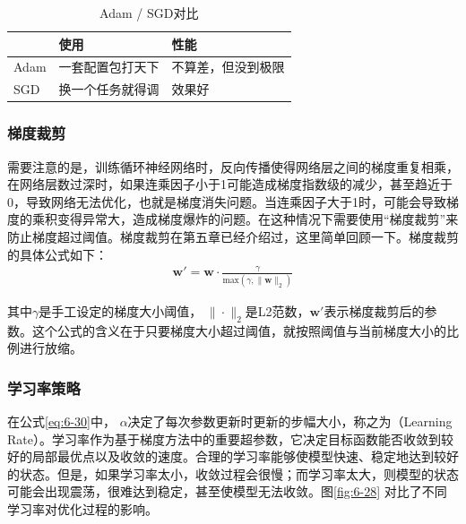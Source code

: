 \begin{table}[htp]
\centering
\caption{ Adam / SGD对比}
\label{tab:6-8}
\begin{tabular}{l | l  l }
	 		&使用		&性能 \\ \hline
\rule{0pt}{13pt}	Adam	&一套配置包打天下	&不算差，但没到极限 \\
\rule{0pt}{13pt}	SGD	&换一个任务就得调	&效果好 \\
\end{tabular}
\end{table}


\vspace{-1.5em}
\subsubsection{梯度裁剪}

\parinterval 需要注意的是，训练循环神经网络时，反向传播使得网络层之间的梯度重复相乘，在网络层数过深时，如果连乘因子小于1可能造成梯度指数级的减少，甚至趋近于0，导致网络无法优化，也就是梯度消失问题。当连乘因子大于1时，可能会导致梯度的乘积变得异常大，造成梯度爆炸的问题。在这种情况下需要使用``梯度裁剪''来防止梯度超过阈值。梯度裁剪在第五章已经介绍过，这里简单回顾一下。梯度裁剪的具体公式如下：
\begin{eqnarray}
\mathbf{w}' = \mathbf{w} \cdot \frac{\gamma} {\textrm{max}(\gamma,\| \mathbf{w} \|_2)}
\label{eq:6-33}
\end{eqnarray}

\noindent 其中$\gamma$是手工设定的梯度大小阈值， $\| \cdot \|_2$是L2范数，$\mathbf{w}'$表示梯度裁剪后的参数。这个公式的含义在于只要梯度大小超过阈值，就按照阈值与当前梯度大小的比例进行放缩。


\subsubsection{学习率策略}

\parinterval 在公式\ref{eq:6-30}中， $\alpha$决定了每次参数更新时更新的步幅大小，称之为{\small{}}（Learning Rate）。学习率作为基于梯度方法中的重要超参数，它决定目标函数能否收敛到较好的局部最优点以及收敛的速度。合理的学习率能够使模型快速、稳定地达到较好的状态。但是，如果学习率太小，收敛过程会很慢；而学习率太大，则模型的状态可能会出现震荡，很难达到稳定，甚至使模型无法收敛。图\ref{fig:6-28} 对比了不同学习率对优化过程的影响。

